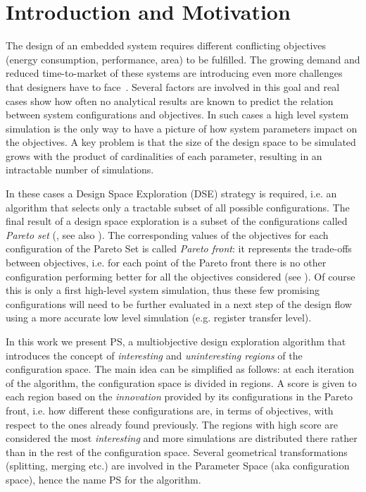 
\section{Introduction and Motivation}

The design of an embedded system requires different conflicting
objectives (energy consumption, performance, area) to be fulfilled.
The growing demand and reduced time-to-market of these systems are
introducing even more challenges that designers have to
face~\cite{wsts}.
Several factors are involved in this goal and real cases show how
often no analytical results are known to predict the relation between
system configurations and objectives. In such cases a high level
system simulation is the only way to have a picture of how system
parameters impact on the objectives.  A key problem is that the size
of the design space to be simulated grows with the product of
cardinalities of each parameter, resulting in an intractable number
of simulations. 

In these cases a Design Space
Exploration (DSE) strategy is required, i.e. an algorithm that selects
only a tractable subset of all possible configurations.
The final result of a design space exploration is a subset of the
configurations called \emph{Pareto set} (\cite{pareto}, see also
). The corresponding values of the objectives for
each configuration of the Pareto Set is called \emph{Pareto front}:
it represents the trade-offs between objectives, i.e.  for each point
of the Pareto front there is no other configuration performing better
for all the objectives considered (see ). Of course this is only a first
high-level system simulation, thus these few promising
configurations will need to be further evaluated in a next step of the design
flow using a more accurate low level simulation (e.g. register
transfer level).



In this work we present PS, a multiobjective design exploration
algorithm that introduces the concept of \emph{interesting} and
\emph{uninteresting regions} of the configuration space.  The main
idea can be simplified as follows: at each iteration of the algorithm,
the configuration space is divided in regions. A score is given to
each region based on the \emph{innovation} provided by its
configurations in the Pareto front, i.e. how different these configurations are, in terms of objectives, with respect to the ones already found previously. The regions with high score are considered the most \emph{interesting} and more simulations are distributed there rather than in the rest of the configuration space.
Several geometrical transformations (splitting, merging etc.) are
involved in the Parameter Space (aka configuration space), hence
the name PS for the algorithm.

